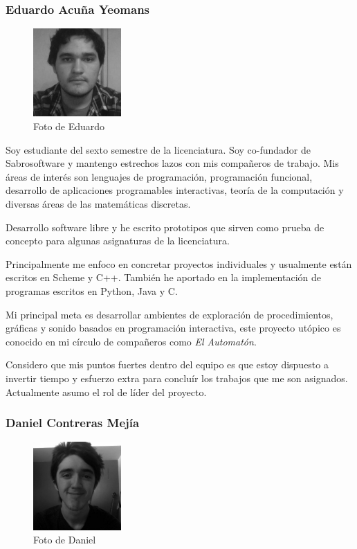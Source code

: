 \documentclass[letterpaper]{article}
\begin{document}
\subsubsection*{Eduardo Acuña Yeomans}

\begin{figure}[h!]
  \centering
    \includegraphics[width=0.3\textwidth]{Eduardo}
    \caption{Foto de Eduardo}
\end{figure}

Soy estudiante del sexto semestre de la licenciatura. Soy co-fundador de Sabrosoftware y mantengo estrechos lazos con mis compañeros de trabajo. Mis áreas de interés son lenguajes de programación, programación funcional, desarrollo de aplicaciones programables interactivas, teoría de la computación y diversas áreas de las matemáticas discretas.

Desarrollo software libre y he escrito prototipos que sirven como prueba de concepto para algunas asignaturas de la licenciatura.

Principalmente me enfoco en concretar proyectos individuales y usualmente están escritos en Scheme y C++. También he aportado en la implementación de programas escritos en Python, Java y C.

Mi principal meta es desarrollar ambientes de exploración de procedimientos, gráficas y sonido basados en programación interactiva, este proyecto utópico es conocido en mi círculo de compañeros como \emph{El Automatón}.

Considero que mis puntos fuertes dentro del equipo es que estoy dispuesto a invertir tiempo y esfuerzo extra para concluír los trabajos que me son asignados. Actualmente asumo el rol de líder del proyecto.

\subsubsection*{Daniel Contreras Mejía}

\begin{figure}[h!]
  \centering
    \includegraphics[width=0.3\textwidth]{Daniel}
    \caption{Foto de Daniel}
\end{figure}
\end{document}

